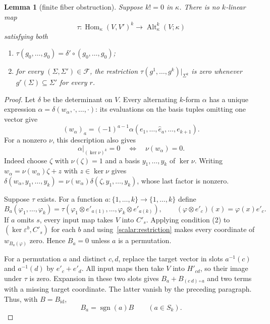 \documentclass[11pt]{amsart}
\newtheorem{lemma}[theorem]{Lemma}
\theoremstyle{definition}
\theoremstyle{remark}
\numberwithin{equation}{section}
\newcommand{\Alt}{\operatorname{Alt}}
\newcommand{\sgn}{\operatorname{sgn}}
\newcommand{\id}{\mathrm{id}}
\theoremstyle{plain}
\theoremstyle{definition}
\theoremstyle{plain}
\begin{document}
\begin{lemma}[finite fiber obstruction]\label{scalar:fibre}
Suppose $k! = 0$ in $\kappa$. There is no $k$\nobreakdash-linear map
\[
 \tau\colon\operatorname{Hom}_\kappa(V,V')^k\longrightarrow\Alt^k_\kappa(V;\kappa)
\]
satisfying both
\begin{enumerate}
\item $\tau(g_0,\dots,g_0)=\delta'\circ(g_0,\dots,g_0)$;
\item for every $(\Sigma,\Sigma')\in\mathcal F$, the restriction
$\tau(g^1,\dots,g^k)|_{\Sigma^k}$ is zero whenever $g^r(\Sigma)\subseteq\Sigma'$ for every $r$.
\end{enumerate}
\end{lemma}

\begin{proof}
Let $\delta$ be the determinant on $V$. Every alternating $k$\nobreakdash-form $\alpha$ has a unique expression
$\alpha=\delta(w_\alpha,\cdot,\dots,\cdot)$: its evaluations on the basis tuples omitting one vector give
\[
 (w_\alpha)_a=(-1)^{a-1}\alpha(e_1,\dots,\widehat e_a,\dots,e_{k+1}).
\]
For a nonzero $\nu$, this description also gives
\begin{equation}\label{scalar:restriction}
 \alpha|_{(\ker\nu)^k}=0\quad\Longleftrightarrow\quad\nu(w_\alpha)=0.
\end{equation}
Indeed choose $\zeta$ with $\nu(\zeta)=1$ and a basis $y_1,\dots,y_k$ of $\ker\nu$. Writing
$w_\alpha=\nu(w_\alpha)\zeta+z$ with $z\in\ker\nu$ gives
$\delta(w_\alpha,y_1,\dots,y_k)=\nu(w_\alpha)\delta(\zeta,y_1,\dots,y_k)$, whose last factor is nonzero.

Suppose $\tau$ exists. For a function $a\colon\{1,\dots,k\}\to\{1,\dots,k\}$ define
\[
 B_a(\varphi_1,\dots,\varphi_k)
 =\tau(\varphi_1\otimes e'_{a(1)},\dots,\varphi_k\otimes e'_{a(k)}),
 \qquad (\varphi\otimes e'_c)(x)=\varphi(x)e'_c.
\]
If $a$ omits $s$, every input map takes $V$ into $C'_s$. Applying condition (2) to
$(\ker\varepsilon^b,C'_s)$ for each $b$ and using~\eqref{scalar:restriction} makes every coordinate of
$w_{B_a(\varphi)}$ zero. Hence $B_a=0$ unless $a$ is a permutation.

For a permutation $a$ and distinct $c,d$, replace the target vector in slots $a^{-1}(c)$ and $a^{-1}(d)$
by $e'_c+e'_d$. All input maps then take $V$ into $H'_{cd}$, so their image under $\tau$ is zero.
Expansion in these two slots gives $B_a+B_{(c\ d)\circ a}$ and two terms with a missing target coordinate.
The latter vanish by the preceding paragraph. Thus, with $B=B_{\id}$,
\begin{equation}\label{scalar:target-sign}
 B_a=\sgn(a)B\qquad(a\in S_k).
\end{equation}


\end{proof}
\end{document}
